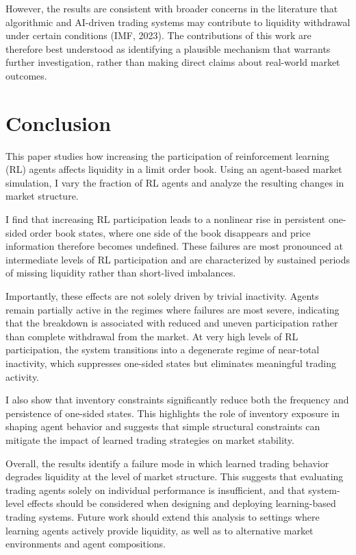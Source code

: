 \documentclass[11pt]{article}
\begin{document}
However, the results are consistent with broader concerns in the literature that algorithmic and AI-driven trading systems may contribute to liquidity withdrawal under certain conditions (IMF, 2023). The contributions of this work are therefore best understood as identifying a plausible mechanism that warrants further investigation, rather than making direct claims about real-world market outcomes.

\section{Conclusion}

This paper studies how increasing the participation of reinforcement learning (RL) agents affects liquidity in a limit order book. Using an agent-based market simulation, I vary the fraction of RL agents and analyze the resulting changes in market structure.

I find that increasing RL participation leads to a nonlinear rise in persistent one-sided order book states, where one side of the book disappears and price information therefore becomes undefined. These failures are most pronounced at intermediate levels of RL participation and are characterized by sustained periods of missing liquidity rather than short-lived imbalances.

Importantly, these effects are not solely driven by trivial inactivity. Agents remain partially active in the regimes where failures are most severe, indicating that the breakdown is associated with reduced and uneven participation rather than complete withdrawal from the market. At very high levels of RL participation, the system transitions into a degenerate regime of near-total inactivity, which suppresses one-sided states but eliminates meaningful trading activity.

I also show that inventory constraints significantly reduce both the frequency and persistence of one-sided states. This highlights the role of inventory exposure in shaping agent behavior and suggests that simple structural constraints can mitigate the impact of learned trading strategies on market stability.

Overall, the results identify a failure mode in which learned trading behavior degrades liquidity at the level of market structure. This suggests that evaluating trading agents solely on individual performance is insufficient, and that system-level effects should be considered when designing and deploying learning-based trading systems. Future work should extend this analysis to settings where learning agents actively provide liquidity, as well as to alternative market environments and agent compositions.
\end{document}

